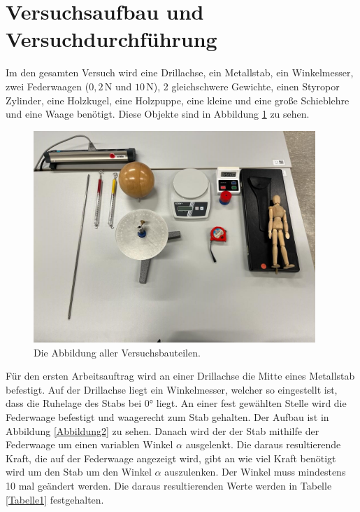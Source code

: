 \section{Versuchsaufbau und Versuchdurchführung}

\begin{flushleft}
    Im den gesamten Versuch wird eine Drillachse, ein Metallstab, ein Winkelmesser, zwei Federwaagen ($0,2\,\unit{\newton}$ und $10\,\unit{\newton}$), 2 gleichschwere Gewichte,
    einen Styropor Zylinder, eine Holzkugel, eine Holzpuppe, eine kleine und eine große Schieblehre und eine Waage benötigt. Diese Objekte sind in Abbildung \ref{Abbildung1} zu sehen. \\
    
    \begin{figure}
        \centering
        \includegraphics[height=80mm]{bilder/gesamt.jpeg}
        \caption{Die Abbildung aller Versuchsbauteilen. \label{Abbildung1}}
    \end{figure}
   

    Für den ersten Arbeitsauftrag wird an einer Drillachse die Mitte eines Metallstab befestigt. 
    Auf der Drillachse liegt ein Winkelmesser, welcher so eingestellt ist, dass die Ruhelage des Stabs bei $ 0 \unit{\degree}$ liegt. 
    An einer fest gewählten Stelle wird die Federwaage befestigt und waagerecht zum Stab gehalten. 
    Der Aufbau ist in Abbildung \ref{Abbildung2} zu sehen. 
    Danach wird der der Stab mithilfe der Federwaage um einen variablen Winkel $ \alpha $ ausgelenkt. 
    Die daraus resultierende Kraft, die auf der Federwaage angezeigt wird, gibt an wie viel Kraft benötigt wird um den Stab um den Winkel $ \alpha $ auszulenken.
    Der Winkel muss mindestens 10 mal geändert werden.
    Die daraus resultierenden Werte werden in Tabelle \ref{Tabelle1} festgehalten.\\


\end{flushleft}

